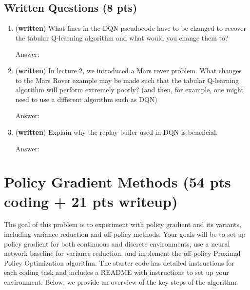\documentclass{article}
\begin{document}
\subsection{Written Questions (8 pts)}


\begin{enumerate}

    \item[(a) (3 pts)] (\textbf{written}) What lines in the DQN pseudocode have to be changed to recover the tabular Q-learning algorithm and what would you change them to?

\begin{tcolorbox}[breakable]
Answer:
\end{tcolorbox}

\clearpage 
    \item[(b) (2 pts)] (\textbf{written}) In lecture 2, we introduced a Mars rover problem. What changes to the Mars Rover example may be made such that the tabular Q-learning algorithm will perform extremely poorly? (and then, for example, one might need to use a different algorithm such as DQN)

\begin{tcolorbox}[breakable]
Answer:
\end{tcolorbox}
\clearpage 

    \item[(c) (3 pts)] (\textbf{written}) Explain why the replay buffer used in DQN is beneficial.

\begin{tcolorbox}[breakable]
Answer:
\end{tcolorbox}
\end{enumerate}

\newpage
\section{Policy Gradient Methods (54 pts coding + 21 pts writeup)}
The goal of this problem is to experiment with policy gradient and its variants, including variance reduction and off-policy methods. Your goals will be to set up policy gradient for both continuous and discrete environments, use a neural network baseline for variance reduction, and implement the off-policy Proximal Policy Optimization algorithm. The starter code has detailed instructions for each coding task and includes a README with instructions to set up your environment. Below, we provide an overview of the key steps of the algorithm.
\end{document}

